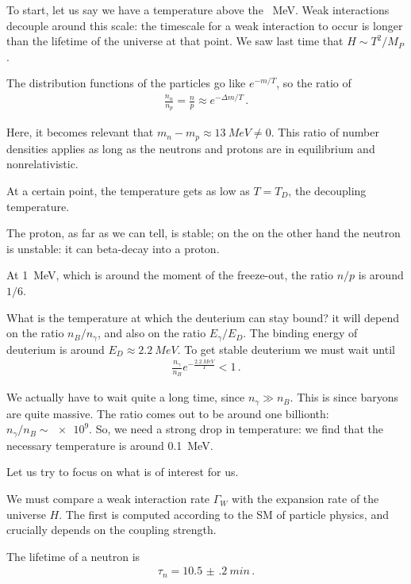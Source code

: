 \documentclass[main.tex]{subfiles}
\begin{document}
To start, let us say we have a temperature above the \SI{}{MeV}. 
Weak interactions decouple around this scale: the timescale for a weak interaction to occur is longer than the lifetime of the universe at that point. 
We saw last time that \(H \sim T^2 / M_P\). 

The distribution functions of the particles go like \(e^{-m / T}\), so the ratio of 
%
\begin{align}
\frac{n_n}{n_p} = \frac{n}{p} \approx e^{- \Delta m / T}
\,.
\end{align}

Here, it becomes relevant that \(m_n - m_p \approx \SI{13}{MeV} \neq 0\). 
This ratio of number densities applies as long as the neutrons and protons are in equilibrium and nonrelativistic.

At a certain point, the temperature gets as low as \(T = T_D\), the decoupling temperature. 

The proton, as far as we can tell, is stable; on the on the other hand the neutron is unstable: it can beta-decay into a proton. 

At \SI{1}{MeV}, which is around the moment of the freeze-out, the ratio \(n/p\) is around \(1/6\). 

What is the temperature at which the deuterium can stay bound? it will depend on the ratio \(n_B / n_\gamma \), and also on the ratio \(E_{\gamma } / E_{D}\). The binding energy of deuterium is around \(E_D \approx \SI{2.2}{MeV}\). To get stable deuterium we must wait until
%
\begin{align}
\frac{n_\gamma }{n_B} e^{- \frac{\SI{2.2}{MeV}}{T}} < 1
\,.
\end{align}

We actually have to wait quite a long time, since \(n_{\gamma } \gg n_B\). 
This is since baryons are quite massive. The ratio comes out to be around one billionth: \(n_\gamma / n_B \sim \num{e9}\). 
So, we need a strong drop in temperature: we find that the necessary temperature is around \SI{0.1}{MeV}. 

Let us try to focus on what is of interest for us. 

We must compare a weak interaction rate \(\Gamma_{W}\) with the expansion rate of the universe \(H\).
The first is computed according to the SM of particle physics, and crucially depends on the coupling strength. 

The lifetime of a neutron is 
%
\begin{align}
\tau_{n} = \SI{10.5(2)}{min}
\,.
\end{align}
\end{document}
